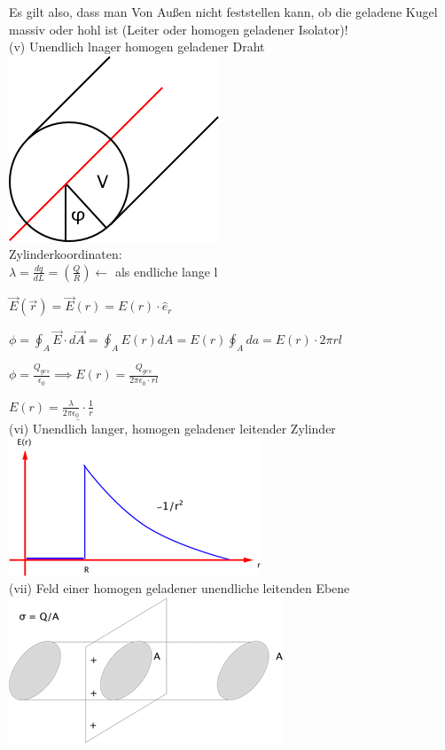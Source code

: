 \documentclass[11pt]{article}
\begin{document}
Es gilt also, dass man Von Au\ss{}en  nicht feststellen kann, ob die geladene Kugel massiv oder hohl ist (Leiter oder homogen geladener Isolator)!\\

(v) Unendlich lnager homogen geladener Draht\\

\includegraphics{skizzen/14/14_6B8}\\

Zylinderkoordinaten:\\

$ \lambda=\frac{dq}{dL}=(\frac{Q}{R})\leftarrow $ als endliche lange l

$ \vec{E}(\vec{r})=\vec{E}(r)=E(r)\cdot\hat{e}_r $

$ \phi=\oint_{A}\vec{E}\cdot d\vec{A}=\oint_{A}E(r)dA=E(r)\oint_{A}da= E(r)\cdot 2\pi r l $

$ \phi=\frac{Q_{ges}}{\epsilon_0}\implies E(r)= \frac{Q_{ges}}{2\pi\epsilon_0\cdot rl} $

$ E(r)= \underline{ \frac{\lambda}{2\pi\epsilon_0}\cdot\frac{1}{r}}$\\

(vi) Unendlich langer, homogen geladener leitender Zylinder\\

\includegraphics{skizzen/14/14_6B9}\\

(vii) Feld einer homogen geladener unendliche leitenden Ebene\\

\includegraphics{skizzen/14/14_6BA}
\end{document}
